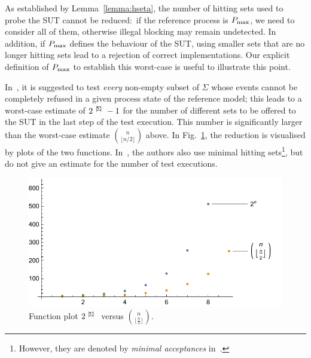 %
As established by Lemma~\ref{lemma:hseta}, the number of hitting sets used to
probe the SUT cannot be reduced:~if the reference process is $P_\text{max}$, we need
to consider all of them, otherwise illegal blocking may remain undetected. In
addition, if $P_\text{max}$ defines the behaviour of the SUT, using smaller sets
that are no longer hitting sets lead to a rejection of correct
implementations. Our explicit definition of $P_\text{max}$ to establish this
worst-case is useful to illustrate this point.

In~\cite{Hennessy:1988:ATP:50497}, it is suggested to test {\it every}
non-empty subset of $\Sigma$ whose events cannot be completely refused in a
given process state of the reference model; this leads to a worst-case
estimate of $2^{{~|\! \Sigma\!|~}}-1$ for the number of different sets to be
offered to the SUT in the last step of the test execution. This number is
significantly larger than the worst-case estimate $\binom{n}{\lfloor
n/2\rfloor}$ above. In Fig.~\ref{fig:minhita}, the reduction is visualised by
plots of the two functions. In~\cite{DBLP:conf/icfem/CavalcantiG07}, the
authors also use minimal hitting sets\footnote{However, they are denoted by
{\it minimal acceptances} in~\cite{DBLP:conf/icfem/CavalcantiG07}.}, but do
not give an estimate for the number of test executions.

 \begin{figure}
 \begin{center}
\includegraphics[scale=.7%
                        ]{curvecomparison.pdf}
\end{center}
\caption{Function plot $2^{{~|\! \Sigma\!|~}}$ versus $\binom{n}{\lfloor \frac{n}{2}\rfloor}$.}
 \label{fig:minhita}
 \end{figure}

